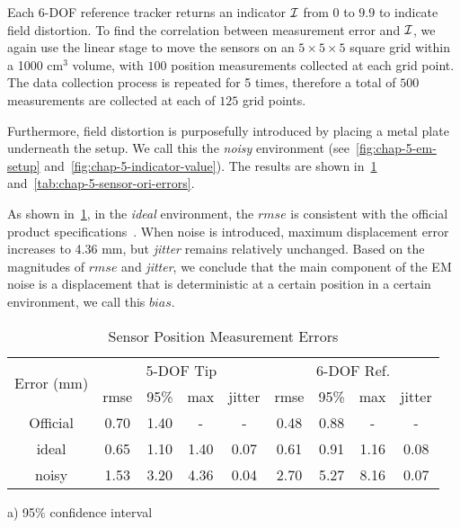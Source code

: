 Each 6-DOF reference tracker returns an indicator $\mathcal{I}$ from $0$ to $9.9$ to indicate field distortion. To find the correlation between measurement error and $\mathcal{I}$, we again use the linear stage to move the sensors on an $5 \times 5 \times 5$ square grid within a 1000 cm$^3$ volume, with $100$ position measurements collected at each grid point. The data collection process is repeated for 5 times, therefore a total of $500$ measurements are collected at each of $125$ grid points.

Furthermore, field distortion is purposefully introduced by placing a metal plate underneath the setup. We call this the \textit{noisy} environment (see~\cref{fig:chap-5-em-setup} and~\cref{fig:chap-5-indicator-value}). The results are shown in~\cref{tab:chap-5-sensor-pos-errors} and~\cref{tab:chap-5-sensor-ori-errors}.

As shown in~\cref{tab:chap-5-sensor-pos-errors}, in the \textit{ideal} environment, the $rmse$ is consistent with the official product specifications~\parencite{AuroraNDIsPremier2024}. When noise is introduced, maximum displacement error increases to 4.36 mm, but \textit{jitter} remains relatively unchanged. Based on the magnitudes of $rmse$ and \textit{jitter}, we conclude that the main component of the EM noise is a displacement that is deterministic at a certain position in a certain environment, we call this $bias$.

\begin{table}[]
\centering
\caption{Sensor Position Measurement Errors}
\label{tab:chap-5-sensor-pos-errors}
\begin{tabular}{c|cccc|cccc}
\toprule
\multirow{2}{*}{Error (mm)} & \multicolumn{4}{c|}{5-DOF Tip} & \multicolumn{4}{c}{6-DOF Ref.} \\
                            & rmse  & 95\%  & max   & jitter & rmse  & 95\%  & max   & jitter \\ \hline
Official                    & 0.70  & 1.40  & -     & -      & 0.48  & 0.88  & -     & -      \\
ideal                       & 0.65  & 1.10  & 1.40  & 0.07   & 0.61  & 0.91  & 1.16  & 0.08   \\
noisy                       & 1.53  & 3.20  & 4.36  & 0.04   & 2.70  & 5.27  & 8.16  & 0.07   \\
\bottomrule
\end{tabular}
\par\smallskip
 \parbox{\columnwidth}{\raggedright\small
    a) 95\% confidence interval}
\end{table}

